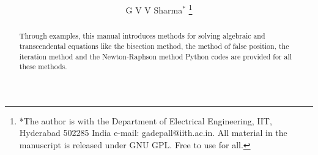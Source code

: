 \documentclass[journal,12pt,twocolumn]{IEEEtran}
\begin{document}
\let\StandardTheFigure\thefigure
\renewcommand{\thefigure}{\theproblem}



\def\putbox#1#2#3{\makebox[0in][l]{\makebox[#1][l]{}\raisebox{\baselineskip}[0in][0in]{\raisebox{#2}[0in][0in]{#3}}}}
     \def\rightbox#1{\makebox[0in][r]{#1}}
     \def\centbox#1{\makebox[0in]{#1}}
     \def\topbox#1{\raisebox{-\baselineskip}[0in][0in]{#1}}
     \def\midbox#1{\raisebox{-0.5\baselineskip}[0in][0in]{#1}}

\vspace{3cm}

\title{ 
}

\author{G V V Sharma$^{*}$ %
\thanks{*The author is with the Department
of Electrical Engineering, IIT, Hyderabad
502285 India e-mail: gadepall@iith.ac.in. All material in the manuscript is released under GNU GPL.  Free to use for all.}%
}



\maketitle




\IEEEpeerreviewmaketitle

\bigskip

\begin{abstract}
Through examples, this manual introduces methods for solving 
algebraic and transcendental equations like the
bisection method, the method of false position,  the iteration method
and the Newton-Raphson method
Python codes are provided for all these methods.
\end{abstract}
%
\end{document}
